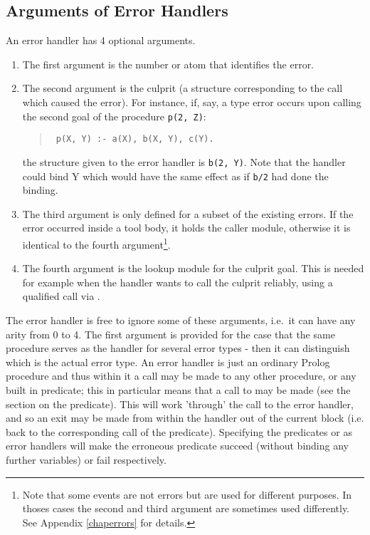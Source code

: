 \subsection{Arguments of Error Handlers}
An error handler has 4 optional arguments.
\begin{enumerate}
\item The first argument is the number or atom that identifies the error.
\item The second argument is
the culprit (a structure corresponding to the call which caused the
error).
For instance, if,
say, a type error occurs upon calling the second goal of the procedure
{\tt p(2, Z)}:
\begin{quote}
\begin{verbatim}
 p(X, Y) :- a(X), b(X, Y), c(Y).
\end{verbatim}
\end{quote}
the structure given to the error handler is {\tt b(2, Y)}.
Note that the handler could bind Y which would have the same effect
as if {\tt b/2} had done the binding.

\item The third argument is only defined for a subset of the existing errors.
If the error occurred inside a tool body, it holds the caller module,
otherwise it is identical to the fourth argument\footnote{
Note that some events are not errors but are used for different purposes.
In thoses cases the second and third argument are sometimes used
differently. See Appendix \ref{chaperrors} for details.}.

\item The fourth argument is the lookup module for the culprit goal.  This
is needed for example when the handler wants to call the culprit reliably,
using a qualified call via .
\end{enumerate}

The error handler is free to ignore some of these arguments,
i.e.\ it can have any arity from 0 to 4.
The first argument is provided for the case that the same procedure serves
as the handler for several error types - then it can distinguish
which is the actual error type.
An error handler is just an ordinary Prolog procedure and thus within
it a call may be made to any other procedure, or any built in predicate;
this in particular means that a call to  may be
made (see the section on the 
predicate). This will work
'through' the call to the error handler, and so an exit may be made from
within the handler out of the current block (i.e. back to the corresponding
call of the  predicate).
Specifying the predicates  or  as error handlers
will make the erroneous predicate succeed (without binding
any further variables) or fail respectively.

